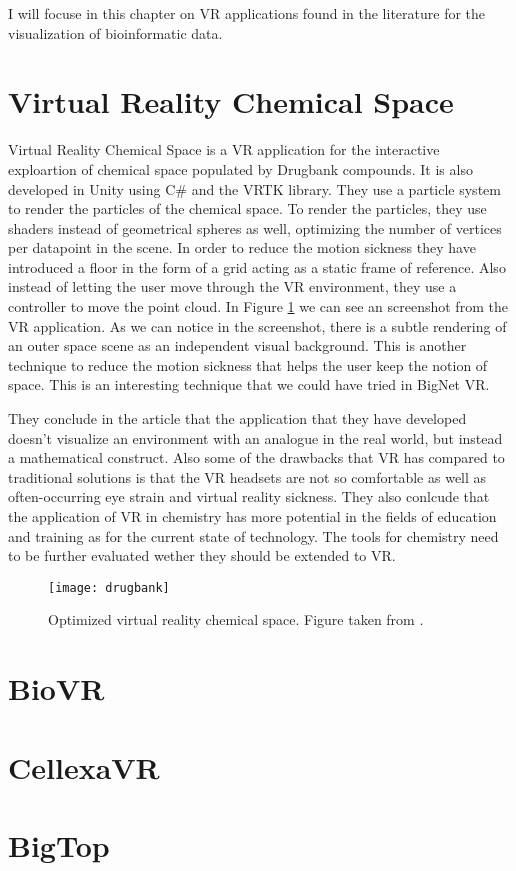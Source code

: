 I will focuse in this chapter on VR applications found in the literature for the visualization of bioinformatic data.

\section{Virtual Reality Chemical Space}
Virtual Reality Chemical Space is a VR application for the interactive exploartion of chemical space populated by Drugbank compounds\cite{drugbank}. It is also developed in Unity using C\# and the VRTK library. They use a particle system to render the particles of the chemical space. To render the particles, they use shaders instead of geometrical spheres as well, optimizing the number of vertices per datapoint in the scene. In order to reduce the motion sickness they have introduced a floor in the form of a grid acting as a static frame of reference. Also instead of letting the user move through the VR environment, they use a controller to move the point cloud. In Figure \ref{fig:drugbank} we can see an screenshot from the VR application. As we can notice in the screenshot, there is a subtle rendering of an outer space scene as an independent visual background. This is another technique to reduce the motion sickness that helps the user keep the notion of space. This is an interesting technique that we could have tried in BigNet VR.

They conclude in the article that the application that they have developed doesn't visualize an environment with an analogue in the real world, but instead a mathematical construct. Also some of the drawbacks that VR has compared to traditional solutions is that the VR headsets are not so comfortable as well as often-occurring eye strain and virtual reality sickness. They also conlcude that the application of VR in chemistry has more potential in the fields of education and training as for the current state of technology. The tools for chemistry need to be further evaluated wether they should be extended to VR.

\begin{figure}[h!]
    \centering%
    \texttt{[image: drugbank]}
    \caption{Optimized virtual reality chemical space. Figure taken from \cite{drugbank}.}
    \label{fig:drugbank}
\end{figure}%

\section{BioVR}

\section{CellexaVR}

\section{BigTop}
